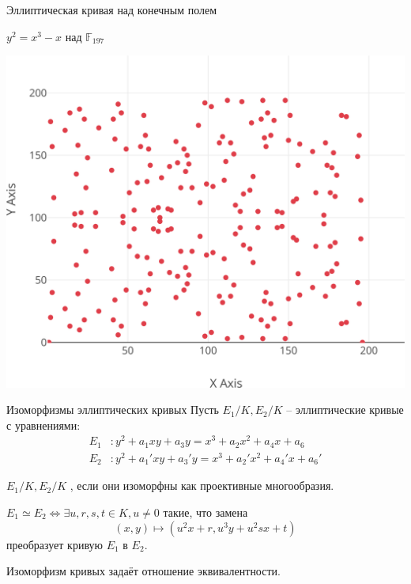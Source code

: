 \documentclass{beamer}
\begin{document}
\begin{frame}{Эллиптическая кривая над конечным полем}
	\begin{block}{$y^2 = x^3 - x$ над $\mathbb{F}_{197}$}
		\begin{center}
			\includegraphics[scale=0.25]{../images/ec_plot_over_Fp}	
		\end{center}
	\end{block}
\end{frame}

\begin{frame}{Изоморфизмы эллиптических кривых}
Пусть $E_1/K, E_2/K$ -- эллиптические кривые с уравнениями:
\begin{equation}
\begin{split}
E_1&: y^2+a_1xy + a_3y = x^3 + a_2x^2 + a_4x + a_6 \\
E_2&: y^2+a_1'xy + a_3'y = x^3 + a_2'x^2 + a_4'x + a_6'
\end{split}
\end{equation}
    
$E_1/K, E_2/K$ , если они изоморфны как проективные многообразия.%

\begin{tcolorbox}[colframe=title-and-section-color!120, colback=title-and-section-color!5, title=Теорема, center title]
$E_1 \simeq E_2 \iff \exists u,r,s,t \in K, u \neq 0$ такие, что замена
\begin{equation}
    \label{eq:isom}
    (x,y) \mapsto (u^2x+r, u^3y+ u^2sx+t)
\end{equation}
преобразует кривую $E_1$ в $E_2$.
\end{tcolorbox}

Изоморфизм кривых задаёт отношение эквивалентности.
\end{frame}
\end{document}
